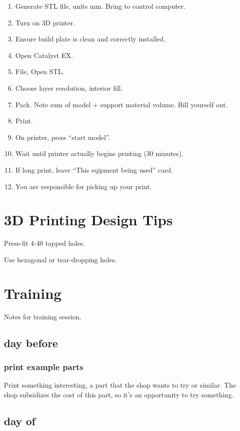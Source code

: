 \documentclass{training}
\begin{document}
\begin{enumerate}
    \item Generate STL file, units mm. Bring to control computer.
    \item Turn on 3D printer.
    \item Ensure build plate is clean and correctly installed.
    \item Open Catalyst EX.
    \item File, Open STL.
    \item Choose layer resolution, interior fill.
    \item Pack. Note sum of model + support material volume. Bill yourself out.
    \item Print.
    \item On printer, press ``start model''.
    \item Wait until printer actually begins printing (30 minutes).
    \item If long print, leave ``This eqipment being used'' card.
    \item You are responsible for picking up your print.
\end{enumerate}

\section{3D Printing Design Tips}

Press-fit 4-40 tapped holes.

Use hexagonal or tear-dropping holes.

\clearpage
\section{Training}
Notes for training session.

\subsection{day before}

\subsubsection{print example parts}

Print something interesting, a part that the shop wants to try or similar.
The shop subsidizes the cost of this part, so it's an opportunity to try something.

\subsection{day of}
\end{document}
